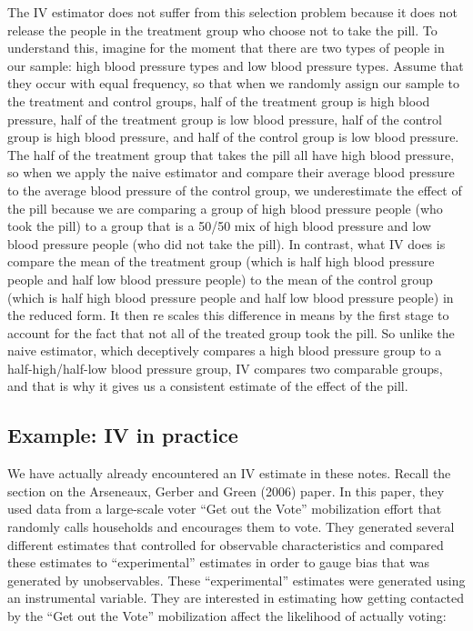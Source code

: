 \documentclass[
]{article}
\begin{document}
The IV estimator does not suffer from this selection problem because it
does not release the people in the treatment group who choose not to
take the pill. To understand this, imagine for the moment that there are
two types of people in our sample: high blood pressure types and low
blood pressure types. Assume that they occur with equal frequency, so
that when we randomly assign our sample to the treatment and control
groups, half of the treatment group is high blood pressure, half of the
treatment group is low blood pressure, half of the control group is high
blood pressure, and half of the control group is low blood pressure. The
half of the treatment group that takes the pill all have high blood
pressure, so when we apply the naive estimator and compare their average
blood pressure to the average blood pressure of the control group, we
underestimate the effect of the pill because we are comparing a group of
high blood pressure people (who took the pill) to a group that is a
50/50 mix of high blood pressure and low blood pressure people (who did
not take the pill). In contrast, what IV does is compare the mean of the
treatment group (which is half high blood pressure people and half low
blood pressure people) to the mean of the control group (which is half
high blood pressure people and half low blood pressure people) in the
reduced form. It then re scales this difference in means by the first
stage to account for the fact that not all of the treated group took the
pill. So unlike the naive estimator, which deceptively compares a high
blood pressure group to a half-high/half-low blood pressure group, IV
compares two comparable groups, and that is why it gives us a consistent
estimate of the effect of the pill.

\subsection{Example: IV in practice}

We have actually already encountered an IV estimate in these notes.
Recall the section on the Arseneaux, Gerber and Green (2006) paper. In
this paper, they used data from a large-scale voter ``Get out the Vote''
mobilization effort that randomly calls households and encourages them
to vote. They generated several different estimates that controlled for
observable characteristics and compared these estimates to
``experimental'' estimates in order to gauge bias that was generated by
unobservables. These ``experimental'' estimates were generated using an
instrumental variable. They are interested in estimating how getting
contacted by the ``Get out the Vote'' mobilization affect the likelihood
of actually voting:
\end{document}
